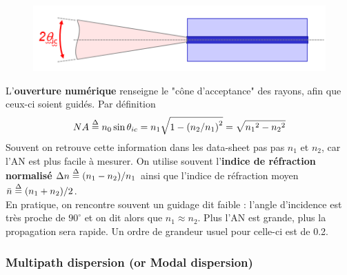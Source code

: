 \begin{figure}
	\vspace{-5mm}
	\includegraphics[scale=0.6]{ch1/image4}
	\end{figure}
L'\textbf{ouverture numérique} renseigne le "cône d'acceptance" des rayons, afin que ceux-ci soient
guidés. Par définition
\begin{equation}
NA \buildrel \Delta \over = {n_0}\sin {\theta _{ic}} = {n_1}\sqrt {1 - {{\left( {{{{n_2}} \mathord{\left/
 {\vphantom {{{n_2}} {{n_1}}}} \right.
 \kern-\nulldelimiterspace} {{n_1}}}} \right)}^2}}  = \sqrt {{n_1}^2 - {n_2}^2} 
\end{equation}
Souvent on retrouve cette information dans les data-sheet pas pas $n_1$ et $n_2$, car l'AN est plus
facile à mesurer. On utilise souvent l'\textbf{indice de réfraction normalisé} $\Delta n \buildrel \Delta \over = {{\left( {{n_1} - {n_2}} \right)} \mathord{\left/
 {\vphantom {{\left( {{n_1} - {n_2}} \right)} {{n_1}}}} \right.
 \kern-\nulldelimiterspace} {{n_1}}}$ ainsi que l'indice de réfraction moyen $\bar n \buildrel \Delta \over = {{\left( {{n_1} + {n_2}} \right)} \mathord{\left/
 {\vphantom {{\left( {{n_1} + {n_2}} \right)} 2}} \right.
 \kern-\nulldelimiterspace} 2}$.\\
 
En pratique, on rencontre souvent un guidage dit faible : l'angle d'incidence est très proche de 
$90^\circ $ et on dit alors que $n_1\approx n_2$. Plus l'AN est grande, plus la propagation sera rapide. Un ordre de grandeur usuel pour celle-ci est de 0.2.

\subsubsection{Multipath dispersion (or Modal dispersion)}

